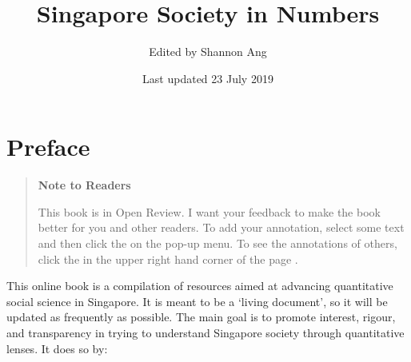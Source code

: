 \documentclass[openany]{book}
\title{Singapore Society in Numbers}
\author{Edited by Shannon Ang}
\date{Last updated 23 July 2019}
\begin{document}
\maketitle

{
\setcounter{tocdepth}{1}
\tableofcontents
}
\chapter*{Preface}\label{preface}

\begin{quote}
\textbf{Note to Readers}

This book is in Open Review. I want your feedback to make the book
better for you and other readers. To add your annotation, {select some
text} and then click the on the pop-up menu. To see the annotations of
others, click the in the upper right hand corner of the page .
\end{quote}

This online book is a compilation of resources aimed at advancing
quantitative social science in Singapore. It is meant to be a `living
document', so it will be updated as frequently as possible. The main
goal is to promote interest, rigour, and transparency in trying to
understand Singapore society through quantitative lenses. It does so by:
\end{document}

